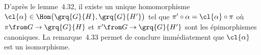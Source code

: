 D'après le lemme~4.32, il existe un unique homomorphisme $\cl{\alpha}\in\Hom\bigl(\grq{G}{H},\grq{G}{H'}\bigr)$ tel que $\pi'\circ\alpha = \cl{\alpha}\circ\pi$ où $\pi\from G\to\grq{G}{H}$ et $\pi'\from G\to\grq{G}{H'}$ sont les épimorphismes canoniques.
La remarque~4.33 permet de conclure immédiatement que $\cl{\alpha}$ est un isomorphisme.
